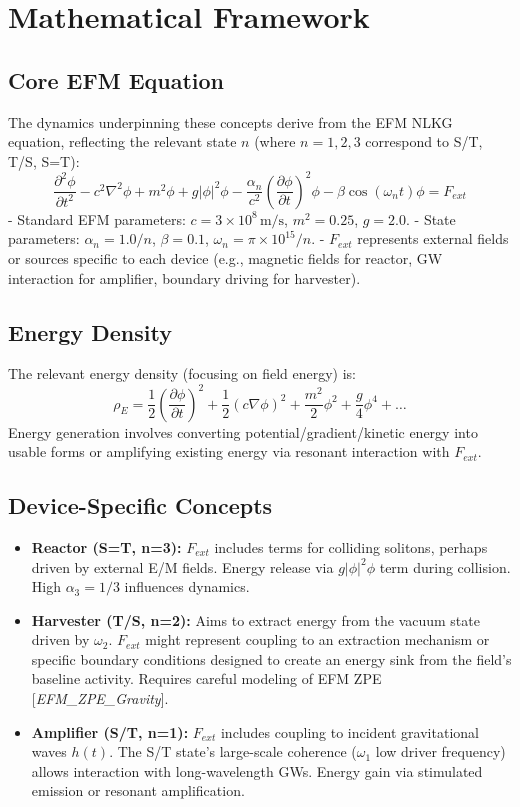 \documentclass[11pt]{article}
\newcommand{\citep}[1]{[\textit{#1}]} %
\begin{document}
\section{Mathematical Framework}
\subsection{Core EFM Equation}
The dynamics underpinning these concepts derive from the EFM NLKG equation, reflecting the relevant state \(n\) (where \(n=1, 2, 3\) correspond to S/T, T/S, S=T):
\begin{equation}
\frac{\partial^2 \phi}{\partial t^2} - c^2 \nabla^2 \phi + m^2 \phi + g |\phi|^2 \phi - \frac{\alpha_n}{c^2} \left(\frac{\partial \phi}{\partial t}\right)^2 \phi - \beta \cos\left(\omega_n t\right) \phi = F_{ext}
\label{eq:efm_energy_kge}
\end{equation}
- Standard EFM parameters: \(c = 3 \times 10^8 \, \text{m/s}\), \(m^2 = 0.25\), \(g = 2.0\).
- State parameters: \(\alpha_n = 1.0/n\), \(\beta = 0.1\), \(\omega_n = \pi \times 10^{15}/n\).
- \(F_{ext}\) represents external fields or sources specific to each device (e.g., magnetic fields for reactor, GW interaction for amplifier, boundary driving for harvester).

\subsection{Energy Density}
The relevant energy density (focusing on field energy) is:
\begin{equation}
\rho_{E} = \frac{1}{2} \left(\frac{\partial \phi}{\partial t}\right)^2 + \frac{1}{2} (c \nabla \phi)^2 + \frac{m^2}{2} \phi^2 + \frac{g}{4} \phi^4 + \dots %
\end{equation}
Energy generation involves converting potential/gradient/kinetic energy into usable forms or amplifying existing energy via resonant interaction with \(F_{ext}\).

\subsection{Device-Specific Concepts}
\begin{itemize}
    \item \textbf{Reactor (S=T, n=3):} \(F_{ext}\) includes terms for colliding solitons, perhaps driven by external E/M fields. Energy release via \(g|\phi|^2\phi\) term during collision. High \(\alpha_3=1/3\) influences dynamics.
    \item \textbf{Harvester (T/S, n=2):} Aims to extract energy from the vacuum state driven by \(\omega_2\). \(F_{ext}\) might represent coupling to an extraction mechanism or specific boundary conditions designed to create an energy sink from the field's baseline activity. Requires careful modeling of EFM ZPE \citep{EFM_ZPE_Gravity}.
    \item \textbf{Amplifier (S/T, n=1):} \(F_{ext}\) includes coupling to incident gravitational waves \(h(t)\). The S/T state's large-scale coherence (\(\omega_1\) low driver frequency) allows interaction with long-wavelength GWs. Energy gain via stimulated emission or resonant amplification.
\end{itemize}
\end{document}
